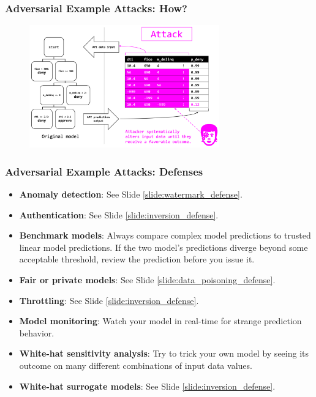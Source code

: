 \documentclass[11pt,
               aspectratio=169,
               hyperref={colorlinks}
               ]{beamer}
\begin{document}
			\begin{frame}[label={slide:adversary}]
		
				\frametitle{Adversarial Example Attacks: \textbf{How?}}		
			
				\begin{figure}[htb]
					\begin{center}
						\includegraphics[height=150pt]{img/adversary.PNG}
					\end{center}
				\end{figure}	

			\end{frame}	
			
			\begin{frame}
		
				\frametitle{Adversarial Example Attacks: \textbf{Defenses}}		
				\small
				\begin{itemize}
					\item \textbf{Anomaly detection}: See Slide \ref{slide:watermark_defense}. 
					\item \textbf{Authentication}: See Slide \ref{slide:inversion_defense}. 
					\item \textbf{Benchmark models}: Always compare complex model predictions to trusted linear model predictions. If the two model’s predictions diverge beyond some acceptable threshold, review the prediction before you issue it.
					\item \textbf{Fair or private models}: See Slide \ref{slide:data_poisoning_defense}.
					\item \textbf{Throttling}: See Slide \ref{slide:inversion_defense}. 
					\item \textbf{Model monitoring}: Watch your model in real-time for strange prediction behavior.
					\item \textbf{White-hat sensitivity analysis}: Try to trick your own model by seeing its outcome on many different combinations of input data values.
					\item \textbf{White-hat surrogate models}: See Slide \ref{slide:inversion_defense}. 
				\end{itemize}
				\normalsize
			\end{frame}
\end{document}
